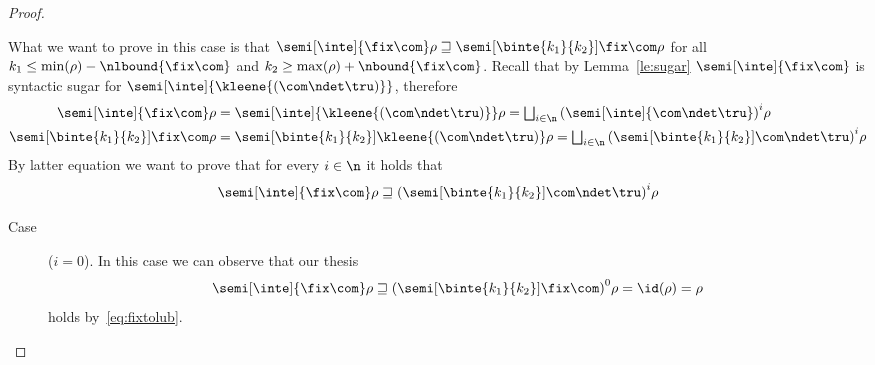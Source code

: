 \begin{proof}
\begin{inductive}
    \case{\(\fix{\com}\)} What we want to prove in this case is that
    \(\semi[\inte]{\fix\com}\rho \sqsupseteq
    \semi[\binte{k_1}{k_2}]{\fix\com}\rho\) for all
    \(k_1 \leq \min(\rho) - \nlbound{\fix\com}\) and
    \(k_2 \geq \max(\rho) + \nbound{\fix\com}\). Recall that by
    Lemma~\ref{le:sugar} \(\semi[\inte]{\fix\com}\) is syntactic sugar
    for \(\semi[\inte]{\kleene{(\com \ndet \tru)}}\), therefore
    \begin{align}
      \semi[\inte]{\fix\com}\rho & =
      \semi[\inte]{\kleene{(\com\ndet\tru)}}\rho =
      \textstyle\bigsqcup_{i\in\n}{\left(\semi[\inte]{\com\ndet\tru}\right)}^i\rho \label{eq:fixtolub}\\
      \semi[\binte{k_1}{k_2}]{\fix\com}\rho & =
      \semi[\binte{k_1}{k_2}]{\kleene{(\com\ndet\tru)}}\rho =
      \textstyle\bigsqcup_{i\in\n}{\left(\semi[\binte{k_1}{k_2}]{\com\ndet\tru}\right)}^i\rho \label{eq:fixtolubk}
    \end{align}
    By latter equation we want to prove that for every \(i\in\n\) it
    holds that
    \begin{equation}
      \semi[\inte]{\fix\com}\rho \sqsupseteq {\left(\semi[\binte{k_1}{k_2}]{\com\ndet\tru}\right)}^i\rho
    \end{equation}
    \begin{description}
    \item[Case] (\(i=0\)). In this case we can observe that our thesis
      \begin{equation*}
        \semi[\inte]{\fix\com}\rho \sqsupseteq {\left(\semi[\binte{k_1}{k_2}]{\fix\com}\right)}^0\rho = \id(\rho) = \rho
      \end{equation*}
      holds by~\eqref{eq:fixtolub}.
      

\end{description}
\end{inductive}
\end{proof}
